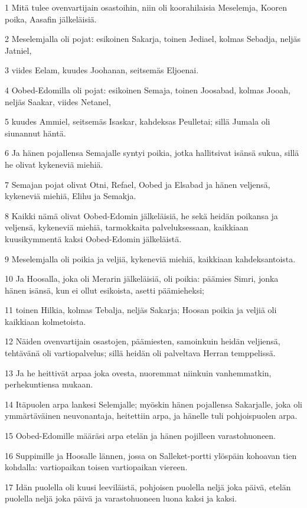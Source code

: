 \par 1 Mitä tulee ovenvartijain osastoihin, niin oli koorahilaisia Meselemja, Kooren poika, Aasafin jälkeläisiä.
\par 2 Meselemjalla oli pojat: esikoinen Sakarja, toinen Jediael, kolmas Sebadja, neljäs Jatniel,
\par 3 viides Eelam, kuudes Joohanan, seitsemäs Eljoenai.
\par 4 Oobed-Edomilla oli pojat: esikoinen Semaja, toinen Joosabad, kolmas Jooah, neljäs Saakar, viides Netanel,
\par 5 kuudes Ammiel, seitsemäs Isaskar, kahdeksas Peulletai; sillä Jumala oli siunannut häntä.
\par 6 Ja hänen pojallensa Semajalle syntyi poikia, jotka hallitsivat isänsä sukua, sillä he olivat kykeneviä miehiä.
\par 7 Semajan pojat olivat Otni, Refael, Oobed ja Elsabad ja hänen veljensä, kykeneviä miehiä, Elihu ja Semakja.
\par 8 Kaikki nämä olivat Oobed-Edomin jälkeläisiä, he sekä heidän poikansa ja veljensä, kykeneviä miehiä, tarmokkaita palveluksessaan, kaikkiaan kuusikymmentä kaksi Oobed-Edomin jälkeläistä.
\par 9 Meselemjalla oli poikia ja veljiä, kykeneviä miehiä, kaikkiaan kahdeksantoista.
\par 10 Ja Hoosalla, joka oli Merarin jälkeläisiä, oli poikia: päämies Simri, jonka hänen isänsä, kun ei ollut esikoista, asetti päämieheksi;
\par 11 toinen Hilkia, kolmas Tebalja, neljäs Sakarja; Hoosan poikia ja veljiä oli kaikkiaan kolmetoista.
\par 12 Näiden ovenvartijain osastojen, päämiesten, samoinkuin heidän veljiensä, tehtävänä oli vartiopalvelus; sillä heidän oli palveltava Herran temppelissä.
\par 13 Ja he heittivät arpaa joka ovesta, nuoremmat niinkuin vanhemmatkin, perhekuntiensa mukaan.
\par 14 Itäpuolen arpa lankesi Selemjalle; myöskin hänen pojallensa Sakarjalle, joka oli ymmärtäväinen neuvonantaja, heitettiin arpa, ja hänelle tuli pohjoispuolen arpa.
\par 15 Oobed-Edomille määräsi arpa etelän ja hänen pojilleen varastohuoneen.
\par 16 Suppimille ja Hoosalle lännen, jossa on Salleket-portti ylöspäin kohoavan tien kohdalla: vartiopaikan toisen vartiopaikan viereen.
\par 17 Idän puolella oli kuusi leeviläistä, pohjoisen puolella neljä joka päivä, etelän puolella neljä joka päivä ja varastohuoneen luona kaksi ja kaksi.
